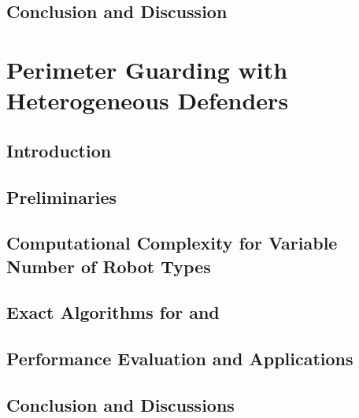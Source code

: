 \subsection{Conclusion and Discussion}\label{section:opg-conclusion}







\section{Perimeter Guarding with Heterogeneous Defenders}

\def\R{\mathcal R}
\def\C{\mathcal C}
\def\S{\mathcal S}
\def\P{\mathcal P}
\def\G{\mathcal G}
\def\W{\mathcal W}
\def\opg{{\sc {OPG}}\xspace}
\def\opglr{{\sc {OPG${}_{LR}$}}\xspace}
\def\opglrd{{\sc {D-OPG${}_{LR}$}}\xspace}
\def\opgmc{{\sc {OPG${}_{MC}$}}\xspace}

\newcommand{\argmin}[1]{\underset{#1}{\operatorname{arg}\,\operatorname{min}}\;}
\newcommand{\argmax}[1]{\underset{#1}{\operatorname{arg}\,\operatorname{max}}\;}

\def\twopart{\textbf{\textsc{Partition}}\xspace}
\def\tpart{\textbf{\textsc{$3$-Partition}}\xspace}
\def\ttkp{\textbf{\textsc{Knapsack}}\xspace}
\def\ttukp{\textbf{\textsc{Unbounded Knapsack}}\xspace}
\def\ttbp{\textbf{\textsc{Bin Packing}}\xspace}
\def\subsetsum{\textbf{\textsc{Subset Sum}}\xspace}

\subsection{Introduction}\label{sec:opgext-intro}


\subsection{Preliminaries}\label{sec:opgext-problem}


\subsection{Computational Complexity for Variable Number of Robot Types}\label{sec:opgext-hardness}


\subsection{Exact Algorithms for \opglr and \opgmc}\label{sec:opgext-algorithm}


\subsection{Performance Evaluation and Applications}\label{sec:opgext-application}


\subsection{Conclusion and Discussions}\label{sec:opgext-conclusion}

